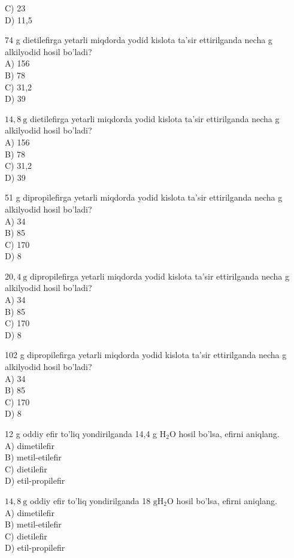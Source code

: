 C) 23\\
D) 11,5
  \item 74 g dietilefirga yetarli miqdorda yodid kislota ta'sir ettirilganda necha g alkilyodid hosil bo'ladi?\\
A) 156\\
B) 78\\
C) 31,2\\
D) 39
  \item $14,8 \mathrm{~g}$ dietilefirga yetarli miqdorda yodid kislota ta'sir ettirilganda necha g alkilyodid hosil bo'ladi?\\
A) 156\\
B) 78\\
C) 31,2\\
D) 39
  \item 51 g dipropilefirga yetarli miqdorda yodid kislota ta'sir ettirilganda necha g alkilyodid hosil bo'ladi?\\
A) 34\\
B) 85\\
C) 170\\
D) 8
  \item $20,4 \mathrm{~g}$ dipropilefirga yetarli miqdorda yodid kislota ta'sir ettirilganda necha g alkilyodid hosil bo'ladi?\\
A) 34\\
B) 85\\
C) 170\\
D) 8
  \item 102 g dipropilefirga yetarli miqdorda yodid kislota ta'sir ettirilganda necha g alkilyodid hosil bo'ladi?\\
A) 34\\
B) 85\\
C) 170\\
D) 8
  \item 12 g oddiy efir to'liq yondirilganda 14,4 g $\mathrm{H}_{2} \mathrm{O}$ hosil bo'lsa, efirni aniqlang.\\
A) dimetilefir\\
B) metil-etilefir\\
C) dietilefir\\
D) etil-propilefir
  \item $14,8 \mathrm{~g}$ oddiy efir to'liq yondirilganda 18 $\mathrm{g} \mathrm{H}_{2} \mathrm{O}$ hosil bo'lsa, efirni aniqlang.\\
A) dimetilefir\\
B) metil-etilefir\\
C) dietilefir\\
D) etil-propilefir
